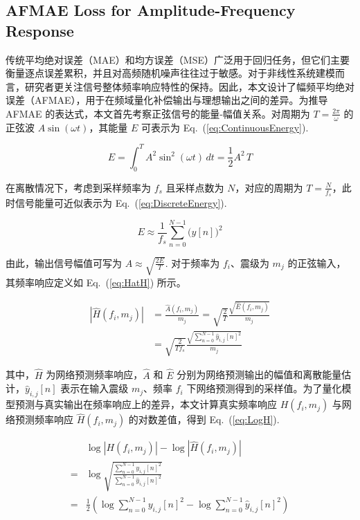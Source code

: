 \documentclass[sn-nature]{sn-jnl}
\newif\ifCNENEnglish
\newif\ifCNENBilingual
\newcommand{\CNEN}[2]{%
    \ifCNENBilingual
        #1%
        \if\relax\detokenize{#2}\relax\else\par #2\fi%
    \else
        \ifCNENEnglish
            #2%
        \else
            #1%
        \fi
    \fi
}
\newcommand{\magn}{m} %
\newcommand{\fidx}{i} %
\newcommand{\midx}{j} %
\newcommand{\pidx}{n} %
\newcommand{\pmax}{N} %
\newcommand{\pred}[1]{\hat{#1}} %
\begin{document}
\subsection{AFMAE Loss for Amplitude-Frequency Response}

\CNEN{传统平均绝对误差（MAE）和均方误差（MSE）广泛用于回归任务，但它们主要衡量逐点误差累积，并且对高频随机噪声往往过于敏感。对于非线性系统建模而言，研究者更关注信号整体频率响应特性的保持。因此，本文设计了幅频平均绝对误差（AFMAE），用于在频域量化补偿输出与理想输出之间的差异。为推导 AFMAE 的表达式，本文首先考察正弦信号的能量-幅值关系。对周期为 $T = \frac{2\pi}{\omega}$ 的正弦波 $A\sin(\omega t)$，其能量 $E$ 可表示为 Eq.~(\ref{eq:ContinuousEnergy}).}{}\begin{equation}
    E = \int_{0}^{T} A^2 \sin^2(\omega t) \, dt = \frac{1}{2} A^2 \, T
    \label{eq:ContinuousEnergy}
\end{equation}

\CNEN{在离散情况下，考虑到采样频率为 $f_s$ 且采样点数为 $\pmax$，对应的周期为 $T = \frac{N}{f_s}$，此时信号能量可近似表示为 Eq.~(\ref{eq:DiscreteEnergy}).}{}
\begin{equation}
    E \approx \frac{1}{f_s} \sum_{\pidx=0}^{\pmax-1} \bigl(y[n]\bigr)^2
    \label{eq:DiscreteEnergy}
\end{equation}

\CNEN{由此，输出信号幅值可写为 $A \approx \sqrt{\frac{2E}{T}}$. 对于频率为 $f_\fidx$、震级为 $\magn_\midx$ 的正弦输入，其频率响应定义如 Eq.~(\ref{eq:HatH}) 所示。}{}
\begin{equation}
    \begin{aligned}
        \left|\pred{H}(f_\fidx,\magn_\midx)\right|
         & = \frac{\pred{A}(f_\fidx,\magn_\midx)}{\magn_\midx}
        = \sqrt{\frac{2}{T}} \frac{\sqrt{\hat{E}(f_\fidx,\magn_\midx)}}{\magn_\midx} \\
        & = \sqrt{\frac{2}{T f_s}} \frac{\sqrt{\sum_{\pidx=0}^{\pmax-1} \hat{y}_{\fidx,\midx}[n]^2}}{\magn_\midx}
    \end{aligned}
    \label{eq:HatH}
\end{equation}

\CNEN{其中，$\pred{H}$ 为网络预测频率响应，$\pred{A}$ 和 $\hat{E}$ 分别为网络预测输出的幅值和离散能量估计，$\hat{y}_{\fidx,\midx}[n]$ 表示在输入震级 $\magn_\midx$、频率 $f_\fidx$ 下网络预测得到的采样值。为了量化模型预测与真实输出在频率响应上的差异，本文计算真实频率响应 $H(f_\fidx,\magn_\midx)$ 与网络预测频率响应 $\pred{H}(f_\fidx,\magn_\midx)$ 的对数差值，得到 Eq.~(\ref{eq:LogH}).}{}\begin{equation}
    \begin{aligned}
                    & \log\left|H(f_\fidx,\magn_\midx)\right| - \log\left|\pred{H}(f_\fidx, \magn_\midx)\right| \\
            = & \log \sqrt{\frac{\sum_{\pidx=0}^{\pmax-1}y_{\fidx,\midx}[n]^2}{\sum_{\pidx=0}^{\pmax-1}\hat{y}_{\fidx,\midx}[n]^2}} \\
            = & \frac{1}{2} \left( \log \sum_{\pidx=0}^{\pmax-1}y_{\fidx,\midx}[n]^2 - \log \sum_{\pidx=0}^{\pmax-1}\hat{y}_{\fidx,\midx}[n]^2 \right)
        \end{aligned}
        \label{eq:LogH}
\end{equation}
\end{document}
